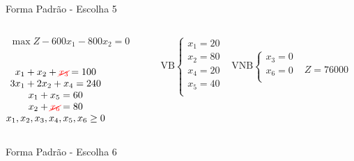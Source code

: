 \begin{frame}
{\begin{block}{Forma Padrão - {\color{cyan}Escolha 5}}
			\begin{columns}
				\begin{column}{0.35\textwidth}
					$
						\begin{matrix}
							\max Z - 600x_1 - 800x_2 = 0 \\
						\end{matrix}
					$ \\
					 \\
					$
						\begin{matrix}
							x_1  + x_2  + {\color{red}\cancel{x_3}}                   = 100 \\
							3x_1 + 2x_2       + x_4             = 240 \\
							x_1                     + x_5       = 60 \\
							x_2                           + {\color{red}\cancel{x_6}} = 80 \\
							x_1,x_2, x_3, x_4, x_5, x_6 \ge 0 \\
						\end{matrix}
					$
				\end{column}
				\vline
				\hspace{0.1cm}
				\begin{column}{0.45\textwidth}
						$
							\begin{matrix}
								\text{VB} \left\{  \begin{matrix}
																 x_1 = 20 \\
																 x_2 = 80 \\
																 x_4 = 20 \\
																 x_5 = 40 \\
												   \end{matrix} 
										   \right.
								&
								\text{VNB} \left\{  \begin{matrix}
																 x_3 = 0 \\
																 x_6 = 0 \\
												   \end{matrix} 
										   \right. 
								\\
							 & \\
							\end{matrix}
						$
						{\color{red}$ Z = 76000 $ }
				\end{column}
			\end{columns}
		\end{block}
	}
	{
		\begin{block}{Forma Padrão - {\color{cyan}Escolha 6}}

\end{block}}
\end{frame}
